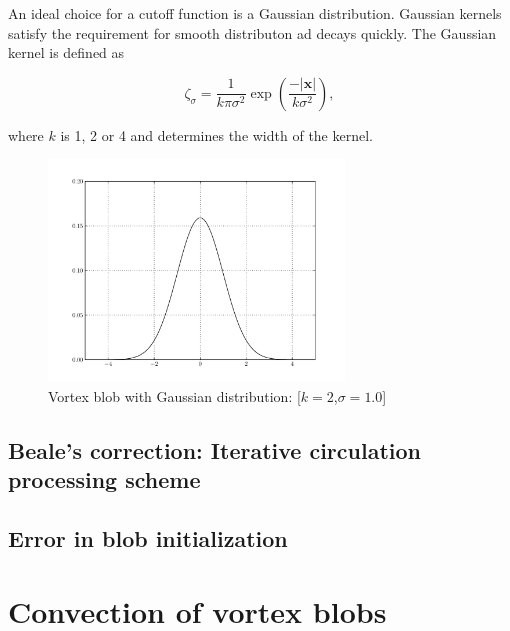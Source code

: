 An ideal choice for a cutoff function is a Gaussian distribution. Gaussian kernels satisfy the requirement for smooth distributon ad decays quickly. The Gaussian kernel is defined as

\begin{equation}
\zeta_{\sigma} = \frac{1}{k\pi\sigma^2}\exp\left(\frac{-\left|\mathbf{x}\right|}{k\sigma^2}\right),
\end{equation}

where $k$ is 1, 2 or 4 and determines the width of the kernel.

\begin{figure}
	\centering
	\includegraphics[width=0.7\textwidth]{figures/theory/gaussianKernel.pdf}
	\caption{Vortex blob with Gaussian distribution: [$k=2$,$\sigma=1.0$]}
\end{figure}


\subsection{Beale's correction: Iterative circulation processing scheme}


\subsection{Error in blob initialization}

\section{Convection of vortex blobs}


